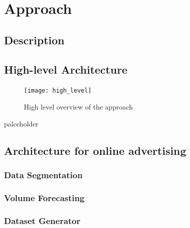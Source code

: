 \chapter{Approach}\label{chap:chap4}

\section*{}

\section{Description}

\section{High-level Architecture}

\begin{figure}[h] \begin{center} \leavevmode
\texttt{[image: high\_level]} \caption{ High level overview
of the approach } \label{fig:highlevel_arch} \end{center} \end{figure}

palceholder

\section{Architecture for online advertising}

\subsection{Data Segmentation}

\subsection{Volume Forecasting}

\subsection{Dataset Generator}

